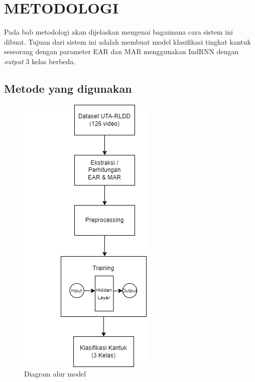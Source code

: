 \chapter{METODOLOGI}
\label{chap:desainimplementasi}


Pada bab metodologi akan dijelaskan mengenai bagaimana cara sistem ini
dibuat. Tujuan dari sistem ini adalah membuat model klasifikasi
tingkat kantuk seseorang dengan parameter EAR dan MAR menggunakan IndRNN
dengan \emph{output} 3 kelas berbeda.

\section{Metode yang digunakan}

\begin{figure} [ht] \centering
      \includegraphics[scale=0.75]{gambar/metodologi.png}
      \caption{Diagram alur model}
      \label{fig:metodologi}
\end{figure}

